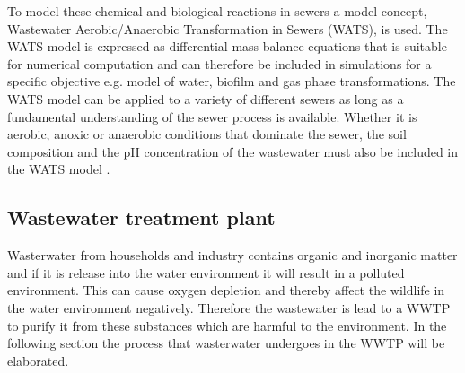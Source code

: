 
To model these chemical and biological reactions in sewers a model concept, Wastewater Aerobic/Anaerobic Transformation in Sewers (WATS), is used. The WATS model is expressed as differential mass balance equations that is suitable for numerical computation and can therefore be included in simulations for a specific objective e.g. model of water, biofilm and gas phase transformations. The WATS model can be applied to a variety of different sewers as long as a fundamental understanding of the sewer process is available. Whether it is aerobic, anoxic or anaerobic conditions that dominate the sewer, the soil composition and the pH concentration of the wastewater must also be included in the WATS model \cite{Sewer_processes}.     





\subsection{Wastewater treatment plant}\label{subse:Wastewater treatment plant}
Wasterwater from households and industry contains organic and inorganic matter and if it is release into the water environment it will result in a polluted environment. This can cause oxygen depletion and thereby affect the wildlife in the water environment negatively. Therefore the wastewater is lead to a WWTP to purify it from these substances which are harmful to the environment. In the following section the process that wasterwater undergoes in the WWTP will be elaborated. 

